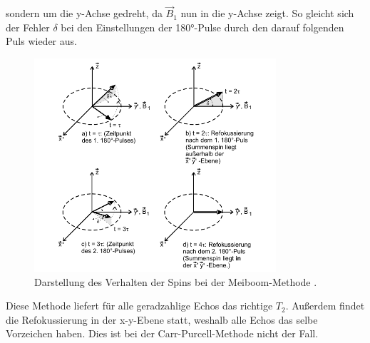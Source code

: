 sondern um die y-Achse gedreht, da $\vec{B}_1$ nun in die y-Achse zeigt.
So gleicht sich der Fehler $\delta $ bei den Einstellungen der 180°-Pulse
durch den darauf folgenden Puls wieder aus.
\begin{figure}[H]
  \centering
  \includegraphics[width=0.8\textwidth]{pics/Meiboom.png}
  \caption{Darstellung des Verhalten der Spins bei der Meiboom-Methode \cite{Anleitung}.}
  \label{fig:Meiboom}
\end{figure}
Diese Methode liefert für alle geradzahlige Echos das richtige $T_2$. Außerdem findet
die Refokussierung in der x-y-Ebene statt, weshalb alle Echos das selbe
Vorzeichen haben. Dies ist bei der Carr-Purcell-Methode nicht der Fall.
